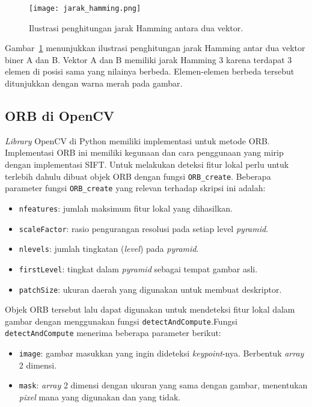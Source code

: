 \begin{figure}[H]
	\centering
	\texttt{[image: jarak\_hamming.png]}
	\caption{Ilustrasi penghitungan jarak Hamming antara dua vektor.}
	\label{fig:jarak_hamming}
\end{figure}

Gambar~\ref{fig:jarak_hamming} menunjukkan ilustrasi penghitungan jarak Hamming antar dua vektor biner A dan B. Vektor A dan B memiliki jarak Hamming 3 karena terdapat 3 elemen di posisi sama yang nilainya berbeda. Elemen-elemen berbeda tersebut ditunjukkan dengan warna merah pada gambar.

\subsection{ORB di OpenCV}
\textit{Library} OpenCV di Python memiliki implementasi untuk metode ORB. Implementasi ORB ini memiliki kegunaan dan cara penggunaan yang mirip dengan implementasi SIFT. Untuk melakukan deteksi fitur lokal perlu untuk terlebih dahulu dibuat objek ORB dengan fungsi \texttt{ORB\_create}. Beberapa parameter fungsi \texttt{ORB\_create} yang relevan terhadap skripsi ini adalah:
\begin{itemize}
	\item \texttt{nfeatures}: jumlah maksimum fitur lokal yang dihasilkan.
	\item \texttt{scaleFactor}: rasio pengurangan resolusi pada setiap level \textit{pyramid}.
	\item \texttt{nlevels}: jumlah tingkatan (\textit{level}) pada \textit{pyramid}.
	\item \texttt{firstLevel}: tingkat dalam \textit{pyramid} sebagai tempat gambar asli.
	\item \texttt{patchSize}: ukuran daerah yang digunakan untuk membuat deskriptor.
\end{itemize}

Objek ORB tersebut lalu dapat digunakan untuk mendeteksi fitur lokal dalam gambar dengan menggunakan fungsi \texttt{detectAndCompute}.Fungsi \texttt{detectAndCompute} menerima beberapa parameter berikut:
\begin{itemize}
	\item \texttt{image}: gambar masukkan yang ingin dideteksi \textit{keypoint}-nya. Berbentuk \textit{array} 2 dimensi.
	\item \texttt{mask}: \textit{array} 2 dimensi dengan ukuran yang sama dengan gambar, menentukan \textit{pixel} mana yang digunakan dan yang tidak.
\end{itemize}

